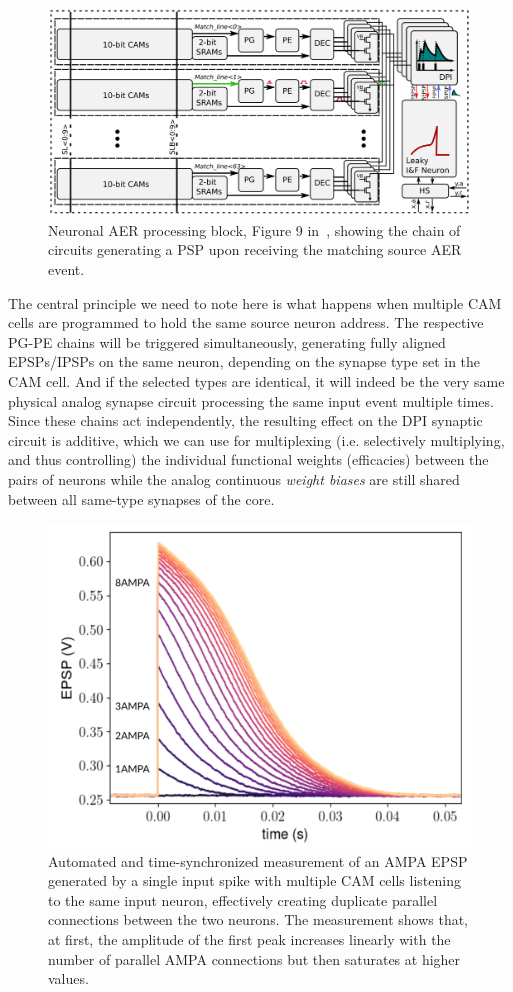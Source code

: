 \begin{figure}[h]
  \centering
    \includegraphics[width=.9\textwidth]{img/chapter4/dynapse_neuron_block_diagram.png}
    \caption[AER processing block of one neuron of the DYNAP-SE1 core]{Neuronal AER processing block, Figure 9 in~\cite{Moradi_etal18}, showing the chain of circuits generating a PSP upon receiving the matching source AER event.}
  \label{fig:dynapse_AER_block}
\end{figure}


The central principle we need to note here is what happens when multiple CAM cells are programmed to hold the same source neuron address. The respective PG-PE chains will be triggered simultaneously, generating fully aligned EPSPs/IPSPs on the same neuron, depending on the synapse type set in the CAM cell. And if the selected types are identical, it will indeed be the very same physical analog synapse circuit processing the same input event multiple times. Since these chains act independently, the resulting effect on the DPI synaptic circuit is additive, which we can use for multiplexing (i.e. selectively multiplying, and thus controlling) the individual functional weights (efficacies) between the pairs of neurons while the analog continuous \emph{weight biases} are still shared between all same-type synapses of the core.

\begin{figure}[b!]
  \centering
    \includegraphics[width=.7\textwidth]{img/chapter4/CAM_multiplexing.png}
    \caption[Multiplexing CAMs for quantized weight control]{Automated and time-synchronized measurement of an AMPA EPSP generated by a single input spike with multiple CAM cells listening to the same input neuron, effectively creating duplicate parallel connections between the two neurons. The measurement shows that, at first, the amplitude of the first peak increases linearly with the number of parallel AMPA connections but then saturates at higher values.}
  \label{fig:CAM_multiplexing}
\end{figure}


